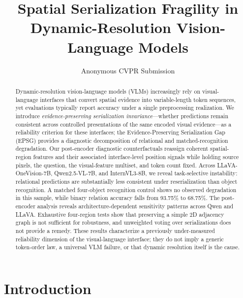 \documentclass[10pt,twocolumn,letterpaper]{article}
\title{Spatial Serialization Fragility in Dynamic-Resolution Vision-Language Models}
\author{Anonymous CVPR Submission}
\date{}
\begin{document}
\maketitle

\begin{abstract}
Dynamic-resolution vision-language models (VLMs) increasingly rely on visual-language interfaces that convert spatial evidence into variable-length token sequences, yet evaluations typically report accuracy under a single preprocessing realization.
We introduce \emph{evidence-preserving serialization invariance}---whether predictions remain consistent across controlled presentations of the same encoded visual evidence---as a reliability criterion for these interfaces; the Evidence-Preserving Serialization Gap (EPSG) provides a diagnostic decomposition of relational and matched-recognition degradation.
Our post-encoder diagnostic counterfactuals reassign coherent spatial-region features and their associated interface-level position signals while holding source pixels, the question, the visual-feature multiset, and token count fixed.
Across LLaVA-OneVision-7B, Qwen2.5-VL-7B, and InternVL3-8B, we reveal task-selective instability: relational predictions are substantially less consistent under reserialization than object recognition.
A matched four-object recognition control shows no observed degradation in this sample, while binary relation accuracy falls from 93.75\% to 68.75\%.
The post-encoder analysis reveals architecture-dependent sensitivity patterns across Qwen and LLaVA.
Exhaustive four-region tests show that preserving a simple 2D adjacency graph is not sufficient for robustness, and unweighted voting over serializations does not provide a remedy.
These results characterize a previously under-measured reliability dimension of the visual-language interface; they do not imply a generic token-order law, a universal VLM failure, or that dynamic resolution itself is the cause.
\end{abstract}

\section{Introduction}
\end{document}
